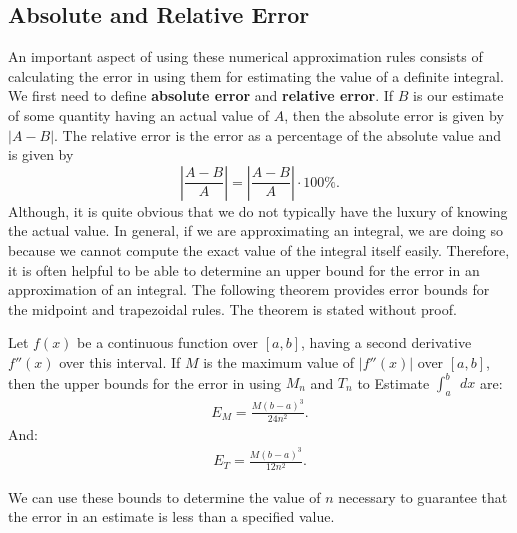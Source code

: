 \documentclass{report}
\begin{document}
        \bigbreak \noindent 
        \subsection*{Absolute and Relative Error}
        \bigbreak \noindent 
        An important aspect of using these numerical approximation rules consists of calculating the error in using them for estimating the value of a definite integral. We first need to define \textbf{absolute error} and \textbf{relative error}.
        \bigbreak \noindent 
        If $B$ is our estimate of some quantity having an actual value of $A$,  then the absolute error is given by $|A-B|$. The relative error is the error as a percentage of the absolute value and is given by 
        \[
        \left| \frac{A-B}{A} \right| = \left| \frac{A-B}{A} \right| \cdot 100\%.
        \]
        \bigbreak \noindent 
        Although, it is quite obvious that we do not typically have the luxury of knowing the actual value. In general, if we are approximating an integral, we are doing so because we cannot compute the exact value of the integral itself easily. Therefore, it is often helpful to be able to determine an upper bound for the error in an approximation of an integral. The following theorem provides error bounds for the midpoint and trapezoidal rules. The theorem is stated without proof.
        \bigbreak \noindent 
        \begin{thrm}
            Let $f(x)$ be a continuous function over $[a,b]$, having a second derivative $f''(x)$ over this interval. If $M$ is the maximum value of $|f''(x)|$ over $[a,b]$, then the upper bounds for the error in using $M_n$ and $T_n$ to
            \bigbreak \noindent 
            Estimate $\int_{a}^{b}\ \ dx $ are:
            \begin{align*}
                E_{M} = \frac{M(b-a)^{3}}{24n^{2}}
            .\end{align*}
            And:
            \begin{align*}
                E_{T} = \frac{M(b-a)^{3}}{12n^{2}}
            .\end{align*}
        \end{thrm}
        \bigbreak \noindent 
        We can use these bounds to determine the value of $n$ necessary to guarantee that the error in an estimate is less than a specified value.
\end{document}
